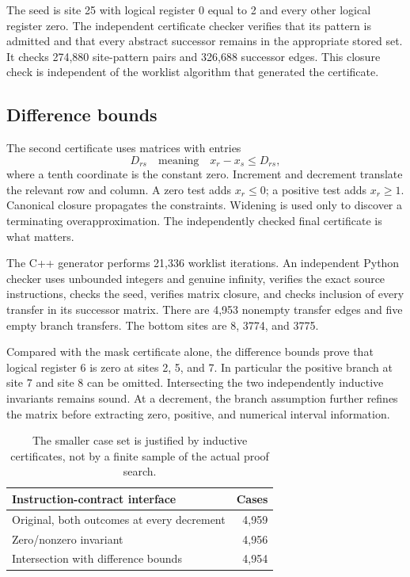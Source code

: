 \documentclass[11pt,letterpaper]{article}
\begin{document}
The seed is site 25 with logical register 0 equal to 2 and every other
logical register zero. The independent certificate checker verifies
that its pattern is admitted and that every abstract successor remains
in the appropriate stored set. It checks 274,880 site-pattern pairs and
326,688 successor edges. This closure check is independent of the
worklist algorithm that generated the certificate.

\subsection{Difference bounds}

The second certificate uses matrices with entries
\[
 D_{rs}\quad\text{meaning}\quad x_r-x_s\le D_{rs},
\]
where a tenth coordinate is the constant zero. Increment and decrement
translate the relevant row and column. A zero test adds $x_r\le0$;
a positive test adds $x_r\ge1$. Canonical closure propagates the
constraints. Widening is used only to discover a terminating overapproximation.
The independently checked final certificate is what matters.

The C++ generator performs 21,336 worklist iterations. An independent
Python checker uses unbounded integers and genuine infinity, verifies
the exact source instructions, checks the seed, verifies matrix closure,
and checks inclusion of every transfer in its successor matrix. There
are 4,953 nonempty transfer edges and five empty branch transfers.
The bottom sites are 8, 3774, and 3775.

Compared with the mask certificate alone, the difference bounds prove
that logical register 6 is zero at sites 2, 5, and 7. In particular the
positive branch at site 7 and site 8 can be omitted. Intersecting the
two independently inductive invariants remains sound. At a decrement,
the branch assumption further refines the matrix before extracting
zero, positive, and numerical interval information.

\begin{table}[ht]
\centering
\begin{tabular}{@{}lr@{}}
\toprule
Instruction-contract interface & Cases\\
\midrule
Original, both outcomes at every decrement & 4,959\\
Zero/nonzero invariant & 4,956\\
Intersection with difference bounds & 4,954\\
\bottomrule
\end{tabular}
\caption{The smaller case set is justified by inductive certificates,
not by a finite sample of the actual proof search.}
\end{table}
\end{document}
